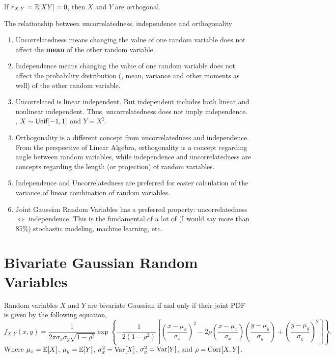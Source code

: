 \begin{definition}
    [Orthogonality]
    If $r_{X,Y}=\E{XY}=0$, then $X$ and $Y$ are orthogonal.
\end{definition}

\begin{theorem}
    The relationship between uncorrelatedness, independence and orthogonality
    \begin{enumerate}
        \item Uncorrelatedness means changing the value of one random variable does not affect the \textbf{mean} of the other random variable.
        \item Independence means changing the value of one random variable does not affect the probability distribution (\ie, mean, variance and other moments as well) of the other random variable.
        \item Uncorrelated is linear independent. But independent includes both linear and nonlinear independent. Thus, uncorrelatedness does not imply independence. \eg, $X\sim \operatorname{\mathsf{Unif}}[-1,1]$ and $Y=X^2$.
        \item Orthogonality is a different concept from uncorrelatedness and independence. From the perspective of Linear Algebra, orthogonality is a concept regarding angle between random variables, while independence and uncorrelatedness are concepts regarding the length (or projection) of random variables.
        \item Independence and Uncorrelatedness are preferred for easier calculation of the variance of linear combination of random variables.
        \item Joint Gaussian Random Variables has a preferred property: uncorrelatedness $\iff$ independence. This is the fundamental of a lot of (I would say more than 85\%) stochastic modeling, machine learning, etc.
    \end{enumerate}
\end{theorem}


\section{Bivariate Gaussian Random Variables}
\begin{definition}
    Random variables $X$ and $Y$ are bivariate Gaussian if and only if their joint PDF is given by the following equation,
    \[f_{X,Y}(x,y)=\frac{1}{2\pi\sigma_x\sigma_y\sqrt{1-\rho^2}}\exp\left\{-\frac{1}{2(1-\rho^2)}\left[\left(\frac{x-\mu_x}{\sigma_x}\right)^2-2\rho\left(\frac{x-\mu_x}{\sigma_x}\right)\left(\frac{y-\mu_y}{\sigma_y}\right)+\left(\frac{y-\mu_y}{\sigma_y}\right)^2\right]\right\}.\]
    Where $\mu_x=\E{X}$, $\mu_y=\E{Y}$, $\sigma_x^2=\operatorname{\textnormal{Var}}[X]$, $\sigma_y^2=\operatorname{\textnormal{Var}}[Y]$, and $\rho=\operatorname{\textnormal{Corr}}[X,Y]$.
\end{definition}

